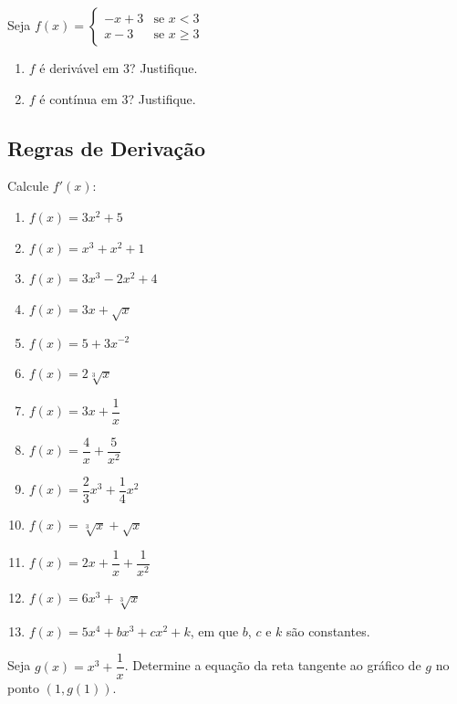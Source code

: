 \begin{exercicio}[3]
Seja $f(x) = \begin{cases} -x + 3 & \text{se } x < 3 \\ x - 3 & \text{se } x \ge 3 \end{cases}$
\begin{enumerate}[label=\alph*)]
    \item $f$ é derivável em 3? Justifique.
    \item $f$ é contínua em 3? Justifique.
\end{enumerate}
\end{exercicio}

\clearpage

\subsection{Regras de Derivação}

\begin{exercicio}[1]
Calcule $f'(x)$:
\begin{enumerate}[label=\alph*)]
    \item $f(x) = 3x^2 + 5$
    \item $f(x) = x^3 + x^2 + 1$
    \item $f(x) = 3x^3 - 2x^2 + 4$
    \item $f(x) = 3x + \sqrt{x}$
    \item $f(x) = 5 + 3x^{-2}$
    \item $f(x) = 2\sqrt[3]{x}$
    \item $f(x) = 3x + \dfrac{1}{x}$
    \item $f(x) = \dfrac{4}{x} + \dfrac{5}{x^2}$
    \item $f(x) = \dfrac{2}{3}x^3 + \dfrac{1}{4}x^2$
    \item $f(x) = \sqrt[3]{x} + \sqrt{x}$
    \item $f(x) = 2x + \dfrac{1}{x} + \dfrac{1}{x^2}$
    \item $f(x) = 6x^3 + \sqrt[3]{x}$
    \item $f(x) = 5x^4 + bx^3 + cx^2 + k$, em que $b$, $c$ e $k$ são constantes.
\end{enumerate}
\end{exercicio}

\begin{exercicio}[2]
Seja $g(x) = x^3 + \dfrac{1}{x}$. Determine a equação da reta tangente ao gráfico de $g$ no ponto $(1, g(1))$.
\end{exercicio}

